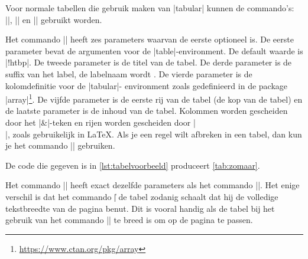 Voor normale tabellen die gebruik maken van |tabular| kunnen de commando's:
|\tabel|, |\tabelmaxpaginabreedgeschaald| en |\langetabel| gebruikt worden.


Het commando |\tabel| heeft zes parameters waarvan de eerste optioneel is.
De eerste parameter bevat de  argumenten voor de |table|-environment.
De default waarde is |!htbp|.
De tweede parameter is de titel van de tabel.
De derde parameter is de suffix van het label, de labelnaam wordt {\lstllabel{}}.
De vierde parameter is de kolomdefinitie voor de |tabular|- environment zoals gedefinieerd in de package |array|\footnote{\url{https://www.ctan.org/pkg/array}}.
De vijfde parameter is de eerste rij van de tabel (de kop van de tabel) en de laatste parameter is de inhoud van de tabel.
Kolommen worden gescheiden door het |&|-teken en rijen worden gescheiden door |\\|, zoals gebruikelijk in \LaTeX{}.
Als je een regel wilt afbreken in een tabel, dan kun je het commando |\newline| gebruiken.

De code die gegeven is in \cref{lst:tabelvoorbeeld} produceert \cref{tab:zomaar}.



Het commando |\tabelmaxpaginabreedgeschaald| heeft exact dezelfde parameters als het commando |\tabel|.
Het enige verschil is dat het commando |\|{\lstlcs{}} de tabel zodanig schaalt dat hij de volledige tekstbreedte van de pagina benut.
Dit is vooral handig als de tabel bij het gebruik van het commando |\tabel| te breed is om op de pagina te passen.

